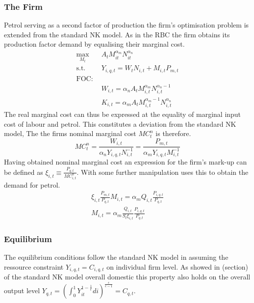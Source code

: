 \documentclass[12pt,a4paper,english]{article} %
\begin{document}
	\subsubsection{The Firm}
	Petrol serving as a second factor of production the firm's optimisation problem is extended from the standard NK model. As in the RBC the firm obtains its production factor demand by equalising their marginal cost.  
	\begin{equation}
		\begin{aligned}
			\max_{M_t} \quad & A_t M_{it}^{\alpha_m} N_{it}^{\alpha_n} \\
			\textrm{s.t.} \quad & Y_{i,q,t} = W_t N_{i,t} + M_{i,t} P_{m,t}\\
			\textrm{FOC:} \\
			\quad & W_{i,t} = \alpha_n A_t M_{i,t}^{\alpha_m} N_{i,t}^{\alpha_n -1}\\
			\quad & K_{i,t} = \alpha_m A_t M_{i,t}^{\alpha_m -1} N_{i,t}^{\alpha_n}
		\end{aligned}
	\end{equation}
	The real marginal cost can thus be expressed at the equality of marginal input cost of labour and petrol. This constitutes a deviation from the standard NK model,  The the firms nominal marginal cost $MC_{t}^n$ is therefore.
	\begin{equation}
		MC_t^n = \frac{W_{i,t}}{\alpha_n Y_{i,q,t} N_{i,t}^{-1}} = \frac{P_{m,t}}{\alpha_m Y_{i,q,t} M_{i,t}^{-1}}
	\end{equation}
	Having obtained nominal marginal cost an expression for the firm's mark-up can be defined as $\xi_{i,t} \equiv \frac{P_{q,t}}{MC_{i,t}^n}$. With some further manipulation \cite{blanchard_macroeconomic_2007} uses this to obtain the demand for petrol.
	\begin{equation}
		\begin{aligned}
		\xi_{i,t} \frac{P_{m,t}}{P_{q,t}} M_{i,t} = \alpha_m Q_{i,t} \frac{P_{i,q,t}}{P_{q,t}} \\
		M_{i,t} = \alpha_m \frac{Q_{i,t}}{S_t \xi_{i,t}} \frac{P_{i,q,t}}{P_{q,t}}
	\end{aligned}
	\end{equation}

	\subsubsection{Equilibrium}
	The equilibrium conditions follow the standard NK model in assuming the ressource constraint $Y_{i,q,t} = C_{i,q,t}$ on individual firm level. As showed in (section) of the standard NK model overall domestic this property also holds on the overall output level $Y_{q,t} = \left( \int_{0}^{1} Y_{it}^{1-\frac{1}{\epsilon}} di \right)^{\frac{\epsilon}{\epsilon - 1}} = C_{q,t}$. \\
	
\end{document}
